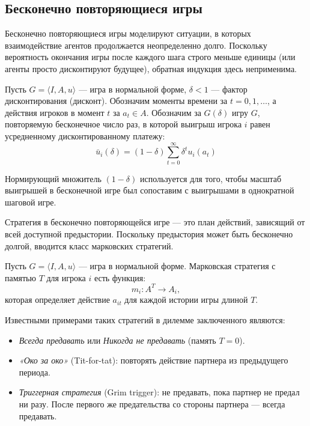 \subsection{Бесконечно повторяющиеся игры}

Бесконечно повторяющиеся игры моделируют ситуации, в которых взаимодействие агентов продолжается неопределенно долго. Поскольку вероятность окончания игры после каждого шага строго меньше единицы (или агенты просто дисконтируют будущее), обратная индукция здесь неприменима. 

\begin{definition}
Пусть $G = \langle I, A, u \rangle$ — игра в нормальной форме, $\delta < 1$ — фактор дисконтирования (дисконт). Обозначим моменты времени за $t = 0, 1, \dots$, а действия игроков в момент $t$ за $a_t \in A$. Обозначим за $G(\delta)$ игру $G$, повторяемую бесконечное число раз, в которой выигрыш игрока $i$ равен усредненному дисконтированному платежу:
\begin{equation}
    \bar{u}_i(\delta) = (1 - \delta) \sum_{t=0}^\infty \delta^t u_i(a_t)
\end{equation}
\end{definition}

Нормирующий множитель $(1 - \delta)$ используется для того, чтобы масштаб выигрышей в бесконечной игре был сопоставим с выигрышами в однократной шаговой игре.

Стратегия в бесконечно повторяющейся игре — это план действий, зависящий от всей доступной предыстории. Поскольку предыстория может быть бесконечно долгой, вводится класс марковских стратегий.

\begin{definition}
Пусть $G = \langle I, A, u \rangle$ — игра в нормальной форме. Марковская стратегия с памятью $T$ для игрока $i$ есть функция:
\begin{equation}
    m_i : A^T \to A_i,
\end{equation}
которая определяет действие $a_{it}$ для каждой истории игры длиной $T$.
\end{definition}

Известными примерами таких стратегий в дилемме заключенного являются:
\begin{itemize}
    \item \textit{Всегда предавать} или \textit{Никогда не предавать} (память $T=0$).
    \item \textit{«Око за око»} (Tit-for-tat): повторять действие партнера из предыдущего периода.
    \item \textit{Триггерная стратегия} (Grim trigger): не предавать, пока партнер не предал ни разу. После первого же предательства со стороны партнера — всегда предавать.
\end{itemize}

